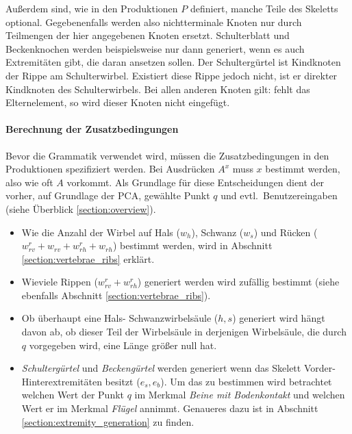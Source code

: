 Außerdem sind, wie in den Produktionen $P$ definiert, manche Teile des Skeletts optional. Gegebenenfalls werden also nichtterminale Knoten nur durch Teilmengen der hier angegebenen Knoten ersetzt. Schulterblatt und Beckenknochen werden beispielsweise nur dann generiert, wenn es auch Extremitäten gibt, die daran ansetzen sollen. Der Schultergürtel ist Kindknoten der Rippe am Schulterwirbel. Existiert diese Rippe jedoch nicht, ist er direkter Kindknoten des Schulterwirbels. Bei allen anderen Knoten gilt: fehlt das Elternelement, so wird dieser Knoten nicht eingefügt.

 
\paragraph{Berechnung der Zusatzbedingungen}

Bevor die Grammatik verwendet wird, müssen die Zusatzbedingungen in den Produktionen spezifiziert werden. Bei Ausdrücken $A^x$ muss $x$ bestimmt werden, also wie oft $A$ vorkommt.
Als Grundlage für diese Entscheidungen dient der vorher, auf Grundlage der PCA, gewählte Punkt $q$ und evtl.\ Benutzereingaben (siehe Überblick \ref{section:overview}).

\begin{itemize}
 \item Wie die Anzahl der Wirbel auf Hals ($w_h$), Schwanz ($w_s$) und Rücken ($w_{rv}^r + w_{rv} + w_{rh}^r + w_{rh}$) bestimmt werden, wird in Abschnitt \ref{section:vertebrae_ribs} erklärt.
 
 \item  Wieviele Rippen ($w_{rv}^r + w_{rh}^r$) generiert werden wird zufällig bestimmt (siehe ebenfalls Abschnitt \ref{section:vertebrae_ribs}).
 
 \item Ob überhaupt eine Hals- \bzw Schwanzwirbelsäule ($h, s$) generiert wird hängt davon ab, ob dieser Teil der Wirbelsäule in derjenigen Wirbelsäule, die durch $q$ vorgegeben wird, eine Länge größer null hat.
 
 \item \emph{Schultergürtel} und \emph{Beckengürtel} werden generiert wenn das Skelett Vorder- \bzw Hinterextremitäten besitzt ($e_s, e_b$). Um das zu bestimmen wird \ua betrachtet welchen Wert der Punkt $q$ im Merkmal \emph{Beine mit Bodenkontakt} und welchen Wert er im Merkmal \emph{Flügel} annimmt. Genaueres dazu ist in Abschnitt \ref{section:extremity_generation} zu finden.
\end{itemize}


